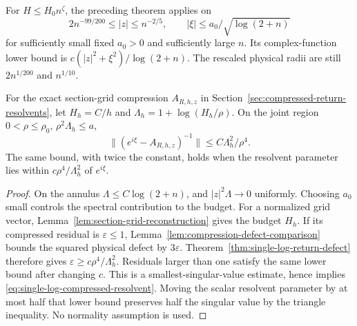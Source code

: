 \begin{corollary}
\label{cor:single-log-compressed}
For $H\le H_0n^\zeta$, the preceding theorem applies on
\[
 2n^{-99/200}\le|z|\le n^{-2/5},\qquad
 |\xi|\le a_0/\sqrt{\log(2+n)}
\]
for sufficiently small fixed $a_0>0$ and sufficiently large $n$.
Its complex-function lower bound is
$c(|z|^2+\xi^2)/\log(2+n)$. The rescaled physical radii are still
$2n^{1/200}$ and $n^{1/10}$.

For the exact section-grid compression $A_{R,h,z}$ in
Section~\ref{sec:compressed-return-resolvents}, let
$H_h=C/h$ and $\Lambda_h=1+\log(H_h/\rho)$. On the joint region
$0<\rho\le\rho_0$, $\rho^2\Lambda_h\le a$,
\begin{equation}\label{eq:single-log-compressed-resolvent}
 \|(e^{i\xi}-A_{R,h,z})^{-1}\|
                          \le C\Lambda_h^2/\rho^4.
\end{equation}
The same bound, with twice the constant, holds when the resolvent
parameter lies within $c\rho^4/\Lambda_h^2$ of $e^{i\xi}$.
\end{corollary}
\begin{proof}
On the annulus $\Lambda\le C\log(2+n)$, and
$|z|^2\Lambda\to0$ uniformly. Choosing $a_0$ small controls the
spectral contribution to the budget. For a normalized grid vector,
Lemma~\ref{lem:section-grid-reconstruction} gives the budget $H_h$.
If its compressed residual is $\varepsilon\le1$,
Lemma~\ref{lem:compression-defect-comparison} bounds the squared
physical defect by $3\varepsilon$. Theorem~\ref{thm:single-log-return-defect}
therefore gives $\varepsilon\ge c\rho^4/\Lambda_h^2$. Residuals
larger than one satisfy the same lower bound after changing $c$.
This is a smallest-singular-value estimate, hence implies
\eqref{eq:single-log-compressed-resolvent}. Moving the scalar resolvent
parameter by at most half that lower bound preserves half the singular
value by the triangle inequality. No normality assumption is used.
\end{proof}


